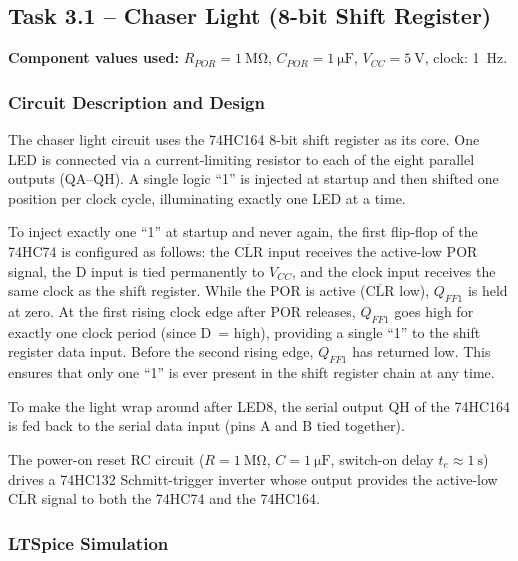 \documentclass[12pt, a4paper]{article}
\begin{document}
\subsection{Task 3.1 -- Chaser Light (8-bit Shift Register)}

\textbf{Component values used:}
$R_{POR} = \SI{1}{\mega\ohm}$,\quad
$C_{POR} = \SI{1}{\micro\farad}$,\quad
$V_{CC} = \SI{5}{\volt}$,\quad
clock: \SI{1}{\hertz}.

\subsubsection{Circuit Description and Design}

The chaser light circuit uses the 74HC164 8-bit shift register as its core.
One LED is connected via a current-limiting resistor to each of the eight parallel
outputs (QA--QH).
A single logic ``1'' is injected at startup and then shifted one position per clock
cycle, illuminating exactly one LED at a time.

To inject exactly one ``1'' at startup and never again, the first flip-flop of the
74HC74 is configured as follows:
the $\overline{\text{CLR}}$ input receives the active-low POR signal, the D input
is tied permanently to $V_{CC}$, and the clock input receives the same clock as
the shift register.
While the POR is active ($\overline{\text{CLR}}$ low), $Q_{FF1}$ is held at zero.
At the first rising clock edge after POR releases, $Q_{FF1}$ goes high for exactly
one clock period (since D~= high), providing a single ``1'' to the shift register
data input.
Before the second rising edge, $Q_{FF1}$ has returned low.
This ensures that only one ``1'' is ever present in the shift register chain at
any time.

To make the light wrap around after LED8, the serial output QH of the 74HC164 is
fed back to the serial data input (pins A and B tied together).

The power-on reset RC circuit ($R = \SI{1}{\mega\ohm}$, $C = \SI{1}{\micro\farad}$,
switch-on delay $t_e \approx \SI{1}{\second}$) drives a 74HC132 Schmitt-trigger
inverter whose output provides the active-low $\overline{\text{CLR}}$ signal to
both the 74HC74 and the 74HC164.

\subsubsection{LTSpice Simulation}
\end{document}
